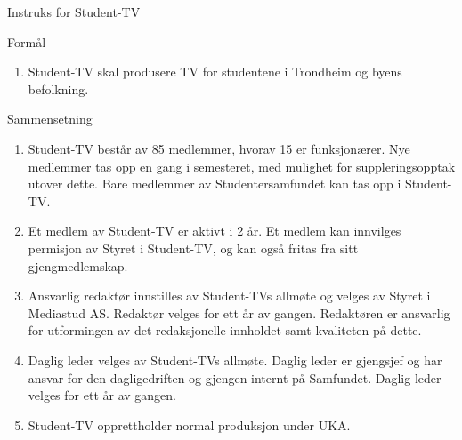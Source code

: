 \begin{instruks*}{Instruks for Student-TV}

    \begin{instruksledd}{Formål}
        \begin{enumerate}
            \item Student-TV skal produsere TV for studentene i Trondheim og byens befolkning.
        \end{enumerate}
    \end{instruksledd}

    \begin{instruksledd}{Sammensetning}
        \begin{enumerate}
            \item Student-TV består av 85 medlemmer, hvorav 15 er funksjonærer. Nye medlemmer tas
                opp en gang i semesteret, med mulighet for suppleringsopptak utover dette. Bare medlemmer av
                Studentersamfundet kan tas opp i Student-TV.
            \item Et medlem av Student-TV er aktivt i 2 år. Et medlem kan innvilges permisjon av
                Styret i Student-TV, og kan også fritas fra sitt gjengmedlemskap.
            \item Ansvarlig redaktør innstilles av Student-TVs allmøte og velges av Styret i
                Mediastud AS. Redaktør velges for ett år av gangen. Redaktøren er ansvarlig for utformingen av det
                redaksjonelle innholdet samt kvaliteten på dette.
            \item Daglig leder velges av Student-TVs allmøte. Daglig leder er gjengsjef og
                har ansvar for den dagligedriften og gjengen internt på Samfundet. Daglig leder velges for ett år av
                gangen.
            \item Student-TV opprettholder normal produksjon under UKA.
        \end{enumerate}
    \end{instruksledd}


\end{instruks*}
